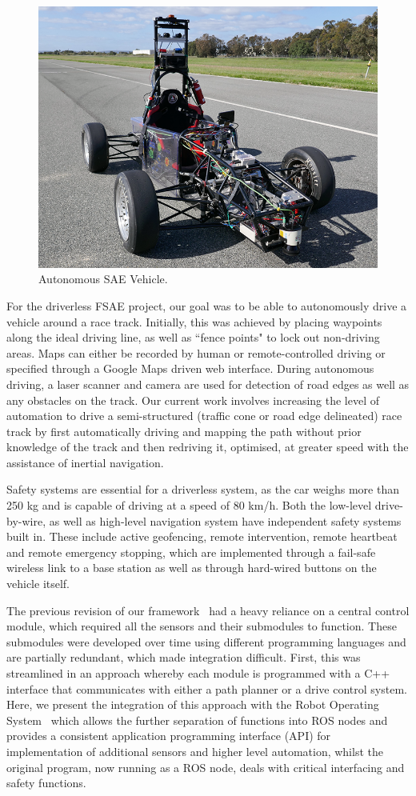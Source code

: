 \begin{figure}[H]
	\centering
	\includegraphics[width=0.7\linewidth]{car}
	\caption{Autonomous SAE Vehicle.}
	\label{fig:7:car}
\end{figure}

For the driverless FSAE project, our goal was to be able to autonomously drive a vehicle around a race track. Initially, this was achieved by placing waypoints along the ideal driving line, as well as ``fence points" to lock out non-driving areas. Maps can either be recorded by human or remote-controlled driving or specified through a Google Maps driven web interface. During autonomous driving, a laser scanner and camera are used for detection of road edges as well as any obstacles on the track. Our current work involves increasing the level of automation to drive a semi-structured (traffic cone or road edge delineated) race track by first automatically driving and mapping the path without prior knowledge of the track and then redriving it, optimised, at greater speed with the assistance of inertial navigation.

Safety systems are essential for a driverless system, as the car weighs more than 250 kg and is capable of driving at a speed of 80 km/h. Both the low-level drive-by-wire, as well as high-level navigation system have independent safety systems built in. These include active geofencing, remote intervention, remote heartbeat and remote emergency stopping, which are implemented through a fail-safe wireless link to a base station as well as through hard-wired buttons on the vehicle itself. 

The previous revision of our framework~\cite{drage_development_2013, lim_modular_2018} had a heavy reliance on a central control module, which required all the sensors and their submodules to function. These submodules were developed over time using different programming languages and are partially redundant, which made integration difficult. First, this was streamlined in an approach whereby each module is programmed with a C++ interface that communicates with either a path planner or a drive control system. Here, we present the integration of this approach with the Robot Operating System~\cite{open_source_robotics_foundation_ros/introduction_nodate} which allows the further separation of functions into ROS nodes and provides a consistent application programming interface (API) for implementation of additional sensors and higher level automation, whilst the original program, now running as a ROS node, deals with critical interfacing and safety functions.

